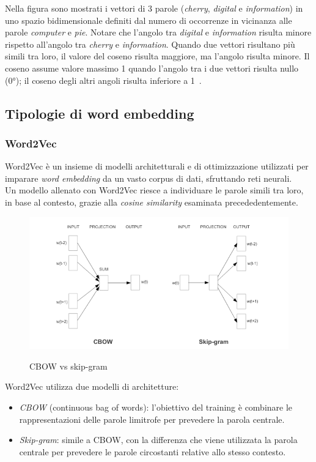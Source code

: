 Nella figura sono mostrati i vettori di 3 parole (\textit{cherry}, \textit{digital} e \textit{information}) in uno spazio bidimensionale definiti dal numero di occorrenze in vicinanza alle parole \textit{computer} e \textit{pie}.
Notare che l'angolo tra \textit{digital} e \textit{information} risulta minore rispetto all'angolo tra \textit{cherry} e \textit{information}.
Quando due vettori risultano più simili tra loro, il valore del coseno risulta maggiore, ma l'angolo risulta minore. Il coseno assume valore massimo 1 quando l'angolo tra i due vettori risulta nullo (0°); il coseno degli altri angoli risulta inferiore a 1~\cite{cosine}.
\subsection{Tipologie di word embedding}

\subsubsection{Word2Vec}

Word2Vec è un insieme di modelli architetturali e di ottimizzazione utilizzati per imparare \emph{word embedding} da un vasto corpus di dati, sfruttando reti neurali.
\\
Un modello allenato con Word2Vec riesce a individuare le parole simili tra loro, in base al contesto, grazie alla \textit{cosine similarity} esaminata precededentemente.

\begin{figure}[h]
    \centering
    \includegraphics[width=15cm]{./immagini/cbow_vs_skipgram.png}
    \label{cbowskipgram}
    \caption{CBOW vs skip-gram~\cite{mikolov2013efficient}}
\end{figure}
\newpage
Word2Vec utilizza due modelli di architetture:
\begin{itemize}
    \item \emph{CBOW} (continuous bag of words): l'obiettivo del training è combinare le rappresentazioni delle parole limitrofe per prevedere la parola centrale.
    \item \emph{Skip-gram}: simile a CBOW, con la differenza che viene utilizzata la parola centrale per prevedere le parole circostanti relative allo stesso contesto.
\end{itemize}

